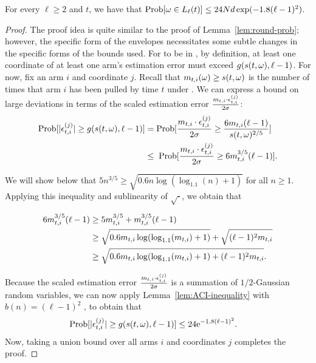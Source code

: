 \begin{lemma} \label{lem:envelope-probability}
For every $\ell \geq 2$ and $t$, we have that
$\Prob{\SP \in \Env[t]{\ell}} \leq 24 \ARMNUM d\exp(-1.8(\ell-1)^2)$. 
\end{lemma}

\begin{proof}
The proof idea is quite similar to the proof of
Lemma~\ref{lem:round-prob};
however, the specific form of the envelopes necessitates some subtle
changes in the specific forms of the bounds used.
For \SP to be in \Env[t]{\ell}, by definition, at least one coordinate
of at least one arm's estimation error must exceed $g(s(t,\omega),\ell-1)$.
For now, fix an arm $i$ and coordinate $j$.
Recall that $m_{t,i}(\omega) \geq s(t,\omega)$ is the number of times
that arm $i$ has been pulled by time $t$ under \SP.
We can express a bound on large deviations in terms of
the scaled estimation error
$\frac{m_{t,i} \cdot \epsilon_{t,i}^{(j)}}{2\sigma}$:
\begin{align*}
\Prob{|\Err{t}{i}{j}| \geq g(s(t,\SP), \ell-1)}
& = \Prob{\frac{\NumPull{t}{i} \cdot \Err{t}{i}{j}}{2\sigma}
          \geq \frac{6\NumPull{t}{i}(\ell-1)}{s(t,\SP)^{2/5}}}\\
& \leq \; \Prob{\frac{\NumPull{t}{i} \cdot \Err{t}{i}{j}}{2\sigma}
          \geq 6\NumPull{t}{i}^{3/5}(\ell-1)}. 
\end{align*}

We will show below that
$5 n^{3/5} \geq \sqrt{0.6n \log(\log_{1.1}(n)+1)}$
for all $n \geq 1$.
Applying this inequality and sublinearity of $\sqrt{\cdot}$,
we obtain that

\begin{align*}
6 m_{t,i}^{3/5}(\ell-1)
& \geq 5 m_{t,i}^{3/5} + m_{t,i}^{3/5}(\ell-1)  \\
& \geq \sqrt{0.6 m_{t,i} \log(\log_{1.1}(m_{t,i})+1)}
     + \sqrt{(\ell-1)^2 m_{t,i}}  \\
& \geq \sqrt{0.6m_{t,i}\log(\log_{1.1}(m_{t,i})+1)+(\ell-1)^2 m_{t,i}}. 
\end{align*}

Because the scaled estimation error
$\frac{m_{t,i} \cdot \epsilon_{t,i}^{(j)}}{2\sigma}$
is a summation of $1/2$-Gaussian random variables, 
we can now apply Lemma~\ref{lem:ACI-inequality}
with $b(n) = (\ell-1)^2$ ,
to obtain that
\begin{align*}
\Prob{|\Err{t}{i}{j}| \geq g(s(t,\SP), \ell-1)}
& \leq 24 \e^{-1.8(\ell-1)^2}.
\end{align*}
Now, taking a union bound over all arms $i$ and
coordinates $j$ completes the proof.


\end{proof}

